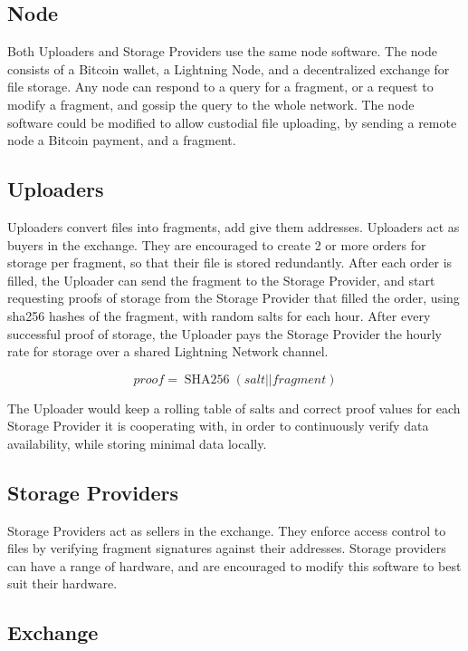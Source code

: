 \documentclass[12pt]{article}
\begin{document}
\subsection{Node}

Both Uploaders and Storage Providers use the same node software. The node consists of a Bitcoin wallet, a Lightning Node, and a decentralized exchange for file storage. Any node can respond to a query for a fragment, or a request to modify a fragment, and gossip the query to the whole network. The node software could be modified to allow custodial file uploading, by sending a remote node a Bitcoin payment, and a fragment.

\subsection{Uploaders}

Uploaders convert files into fragments, add give them addresses. Uploaders act as buyers in the exchange. They are encouraged to create 2 or more orders for storage per fragment, so that their file is stored redundantly. After each order is filled, the Uploader can send the fragment to the Storage Provider, and start requesting proofs of storage from the Storage Provider that filled the order, using sha256 hashes of the fragment, with random salts for each hour. After every successful proof of storage, the Uploader pays the Storage Provider the hourly rate for storage over a shared Lightning Network channel.

\[
    proof = \operatorname{SHA256}(salt || fragment)
\]

The Uploader would keep a rolling table of salts and correct proof values for each Storage Provider it is cooperating with, in order to continuously verify data availability, while storing minimal data locally.

\subsection{Storage Providers}

Storage Providers act as sellers in the exchange. They enforce access control to files by verifying fragment signatures against their addresses. Storage providers can have a range of hardware, and are encouraged to modify this software to best suit their hardware.

\subsection{Exchange}
\end{document}
